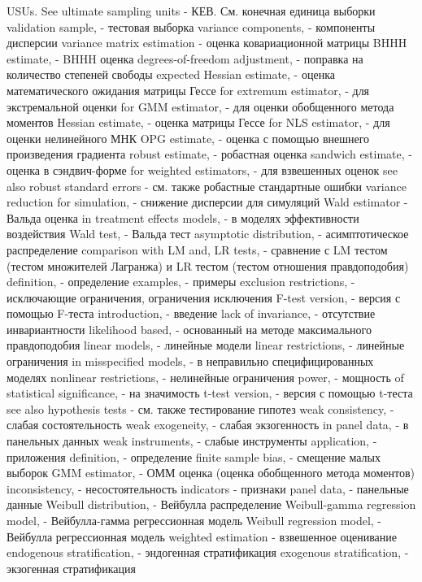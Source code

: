 USUs. See ultimate sampling units - КЕВ. См. конечная единица выборки
validation sample, - тестовая выборка
variance components, - компоненты дисперсии
variance matrix estimation - оценка ковариационной матрицы
BHHH estimate, - BHHH оценка
degrees-of-freedom adjustment, - поправка на количество степеней свободы
expected Hessian estimate, - оценка математического ожидания матрицы Гессе
for extremum estimator, - для экстремальной оценки
for GMM estimator, - для оценки обобщенного метода моментов
Hessian estimate, - оценка матрицы Гессе
for NLS estimator, - для оценки нелинейного МНК
OPG estimate, - оценка с помощью внешнего произведения градиента
robust estimate, - робастная оценка
sandwich estimate, - оценка в сэндвич-форме
for weighted estimators, - для взвешенных оценок
see also robust standard errors - см. также робастные стандартные ошибки
variance reduction for simulation, - снижение дисперсии для симуляций
Wald estimator - Вальда оценка
in treatment effects models, - в моделях эффективности воздействия
Wald test, - Вальда тест
asymptotic distribution, - асимптотическое распределение
comparison with LM and, LR tests, - сравнение с LM тестом (тестом множителей Лагранжа) и LR тестом (тестом отношения правдоподобия)
definition, - определение
examples, - примеры
exclusion restrictions, - исключающие ограничения, ограничения исключения
F-test version, - версия с помощью F-теста
introduction, - введение
lack of invariance, - отсутствие инвариантности
likelihood based, - основанный на методе максимального правдоподобия
linear models, - линейные модели
linear restrictions, - линейные ограничения
in misspecified models, - в неправильно специфицированных моделях
nonlinear restrictions, - нелинейные ограничения
power, - мощность
of statistical significance, - на значимость
t-test version, - версия с помощью t-теста
see also hypothesis tests - см. также тестирование гипотез
weak consistency, - слабая состоятельность
weak exogeneity, - слабая экзогенность
in panel data, - в панельных данных
weak instruments, - слабые инструменты
application, - приложения
definition, - определение
finite sample bias, - смещение малых выборок
GMM estimator, - ОММ оценка (оценка обобщенного метода моментов)
inconsistency, - несостоятельность
indicators - признаки
panel data, - панельные данные
Weibull distribution, - Вейбулла распределение
Weibull-gamma regression model, - Вейбулла-гамма регрессионная модель
Weibull regression model, - Вейбулла регрессионная модель
weighted estimation - взвешенное оценивание
endogenous stratification, - эндогенная стратификация
exogenous stratification, - экзогенная стратификация
